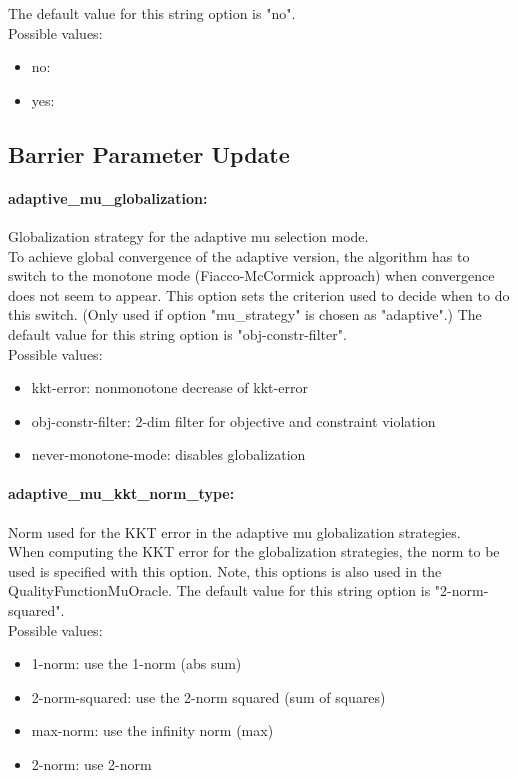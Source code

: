 The default value for this string option is "no".
\\ 
Possible values:
\begin{itemize}
   \item no: 
   \item yes: 
\end{itemize}

\subsection{Barrier Parameter Update}
\label{sec:Barrier_Parameter_Update}
\paragraph{adaptive\_mu\_globalization:}\label{sec:adaptive_mu_globalization} Globalization strategy for the adaptive mu selection mode. $\;$ \\
 To achieve global convergence of the adaptive
version, the algorithm has to switch to the
monotone mode (Fiacco-McCormick approach) when
convergence does not seem to appear.  This option
sets the criterion used to decide when to do this
switch. (Only used if option "mu\_strategy" is
chosen as "adaptive".)
The default value for this string option is "obj-constr-filter".
\\ 
Possible values:
\begin{itemize}
   \item kkt-error: nonmonotone decrease of kkt-error
   \item obj-constr-filter: 2-dim filter for objective and constraint
violation
   \item never-monotone-mode: disables globalization
\end{itemize}

\paragraph{adaptive\_mu\_kkt\_norm\_type:}\label{sec:adaptive_mu_kkt_norm_type} Norm used for the KKT error in the adaptive mu globalization strategies. $\;$ \\
 When computing the KKT error for the
globalization strategies, the norm to be used is
specified with this option. Note, this options is
also used in the QualityFunctionMuOracle.
The default value for this string option is "2-norm-squared".
\\ 
Possible values:
\begin{itemize}
   \item 1-norm: use the 1-norm (abs sum)
   \item 2-norm-squared: use the 2-norm squared (sum of squares)
   \item max-norm: use the infinity norm (max)
   \item 2-norm: use 2-norm
\end{itemize}

